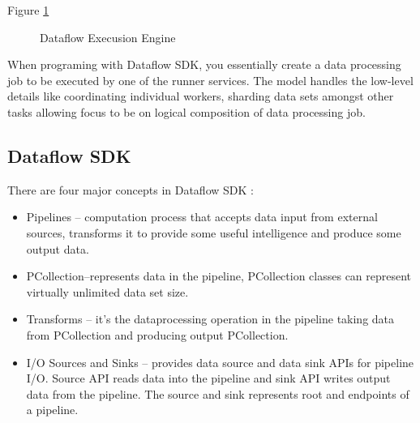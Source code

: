 \documentclass[9pt,twocolumn,twoside]{styles/osajnl}
\begin{document}
Figure \ref{fig:false-color}

\begin{figure}[htbp]
\centering
{}
\caption{Dataflow Execusion Engine \cite{www-beamincubate}}
\label{fig:false-color}
\end{figure}

When programing with Dataflow SDK, you essentially create a data
processing job to be executed by one of the runner services. The model
handles the low-level details like coordinating individual workers,
sharding data sets amongst other tasks allowing focus to be on logical
composition of data processing job.

\subsection{Dataflow SDK}

There are four major concepts in Dataflow SDK \cite{www-sdkmodel}:

\begin{itemize}
\renewcommand{\labelitemi}{\scriptsize$\square$}

\item Pipelines – computation process that accepts data input from
  external sources, transforms it to provide some useful intelligence
  and produce some output data.
\item PCollection–represents data in the pipeline, PCollection classes
  can represent virtually unlimited data set size.
\item Transforms – it’s the dataprocessing operation in the pipeline
  taking data from PCollection and producing output PCollection.
\item I/O Sources and Sinks – provides data source and data sink APIs
  for pipeline I/O. Source API reads data into the pipeline and sink
  API writes output data from the pipeline. The source and sink
  represents root and endpoints of a pipeline.
  
\end{itemize}
\end{document}
